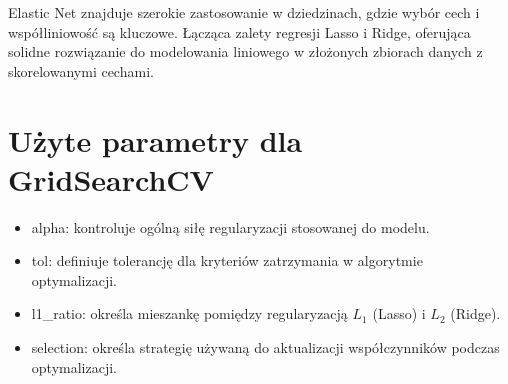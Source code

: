 Elastic Net znajduje szerokie zastosowanie w dziedzinach, gdzie wybór cech i współliniowość są kluczowe. Łącząca zalety regresji Lasso i Ridge, oferująca solidne rozwiązanie do modelowania liniowego w złożonych zbiorach danych z skorelowanymi cechami.


{}
\section*{Użyte parametry dla GridSearchCV \cite{url_ElasticNet, url_grid_search}}
\vspace{-1.0em}
\label{sec:ml_challenges}

\begin{itemize}
\setlength\itemsep{-0.5em}
 \item  alpha: kontroluje ogólną siłę regularyzacji stosowanej do modelu.
\item tol: definiuje tolerancję dla kryteriów zatrzymania w algorytmie optymalizacji.
\item l1\_ratio: określa mieszankę pomiędzy regularyzacją $L_1$ (Lasso) i $L_2$ (Ridge).
\item selection: określa strategię używaną do aktualizacji współczynników podczas optymalizacji.
\end{itemize}
\noindent\makebox[\linewidth]{\rule{\paperwidth}{0.4pt}}